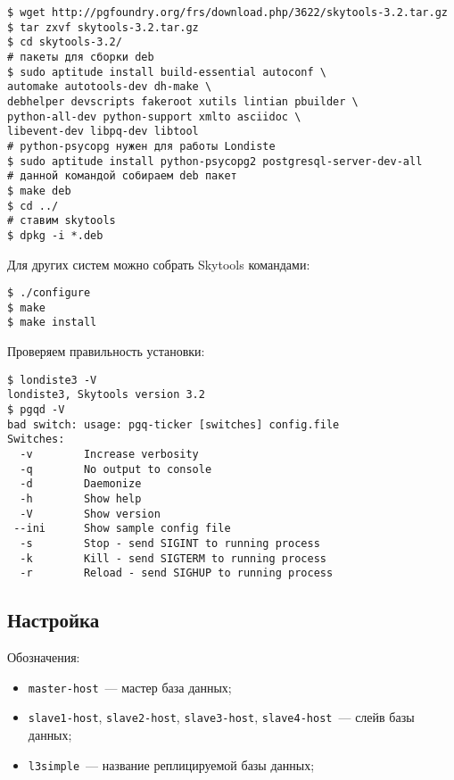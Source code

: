 \begin{lstlisting}[label=lst:londiste2,caption=Установка]
$ wget http://pgfoundry.org/frs/download.php/3622/skytools-3.2.tar.gz
$ tar zxvf skytools-3.2.tar.gz
$ cd skytools-3.2/
# пакеты для сборки deb
$ sudo aptitude install build-essential autoconf \
automake autotools-dev dh-make \
debhelper devscripts fakeroot xutils lintian pbuilder \
python-all-dev python-support xmlto asciidoc \
libevent-dev libpq-dev libtool
# python-psycopg нужен для работы Londiste
$ sudo aptitude install python-psycopg2 postgresql-server-dev-all
# данной командой собираем deb пакет
$ make deb
$ cd ../
# ставим skytools
$ dpkg -i *.deb
\end{lstlisting}

Для других систем можно собрать Skytools командами:

\begin{lstlisting}[label=lst:londiste3,caption=Установка]
$ ./configure
$ make
$ make install
\end{lstlisting}

Проверяем правильность установки:

\begin{lstlisting}[label=lst:londiste4,caption=Установка]
$ londiste3 -V
londiste3, Skytools version 3.2
$ pgqd -V
bad switch: usage: pgq-ticker [switches] config.file
Switches:
  -v        Increase verbosity
  -q        No output to console
  -d        Daemonize
  -h        Show help
  -V        Show version
 --ini      Show sample config file
  -s        Stop - send SIGINT to running process
  -k        Kill - send SIGTERM to running process
  -r        Reload - send SIGHUP to running process
\end{lstlisting}


\subsection{Настройка}

Обозначения:

\begin{itemize}
  \item \lstinline!master-host!~--- мастер база данных;
  \item \lstinline!slave1-host!, \lstinline!slave2-host!, \lstinline!slave3-host!, \lstinline!slave4-host!~--- слейв базы данных;
  \item \lstinline!l3simple!~--- название реплицируемой базы данных;
\end{itemize}

